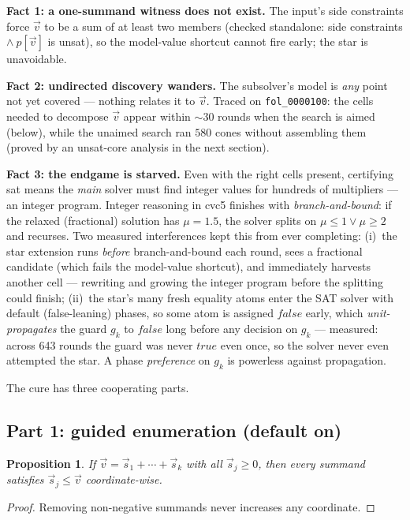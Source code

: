 \documentclass[11pt]{article}
\newcommand{\cvc}{\textsf{cvc5}\xspace}
\newcommand{\vv}{\ensuremath{\vec{v}}\xspace}
\newcommand{\true}{\ensuremath{\mathit{true}}\xspace}
\newcommand{\false}{\ensuremath{\mathit{false}}\xspace}
\newtheorem{proposition}{Proposition}
\begin{document}
\textbf{Fact 1: a one-summand witness does not exist.} The input's side
constraints force $\vv$ to be a sum of at least two members (checked
standalone: side constraints $\wedge\ p[\vv]$ is \textsf{unsat}), so the
model-value shortcut cannot fire early; the star is unavoidable.

\textbf{Fact 2: undirected discovery wanders.} The subsolver's model is
\emph{any} point not yet covered --- nothing relates it to $\vv$. Traced
on \texttt{fol\_0000100}: the cells needed to decompose $\vv$ appear
within ${\sim}30$ rounds when the search is aimed (below), while the
unaimed search ran $580$ cones without assembling them (proved by an
\textsf{unsat}-core analysis in the next section).

\textbf{Fact 3: the endgame is starved.} Even with the right cells
present, certifying \textsf{sat} means the \emph{main} solver must find
integer values for hundreds of multipliers --- an integer program. Integer
reasoning in \cvc finishes with \emph{branch-and-bound}: if the relaxed
(fractional) solution has $\mu = 1.5$, the solver splits on
$\mu \le 1 \vee \mu \ge 2$ and recurses. Two measured interferences kept
this from ever completing: (i)~the star extension runs \emph{before}
branch-and-bound each round, sees a fractional candidate (which fails the
model-value shortcut), and immediately harvests another cell --- rewriting
and growing the integer program before the splitting could finish;
(ii)~the star's many fresh equality atoms enter the SAT solver with
default (false-leaning) phases, so some atom is assigned \false{} early,
which \emph{unit-propagates} the guard $g_k$ to \false{} long before any
decision on $g_k$ --- measured: across 643 rounds the guard was never
\true{} even once, so the solver never even attempted the star. A phase
\emph{preference} on $g_k$ is powerless against propagation.

The cure has three cooperating parts.

\subsection{Part 1: guided enumeration (default on)}

\begin{proposition}
If $\vv = \vec{s}_1 + \cdots + \vec{s}_k$ with all $\vec{s}_j \ge 0$,
then every summand satisfies $\vec{s}_j \le \vv$ coordinate-wise.
\end{proposition}
\begin{proof}
Removing non-negative summands never increases any coordinate.
\end{proof}
\end{document}
